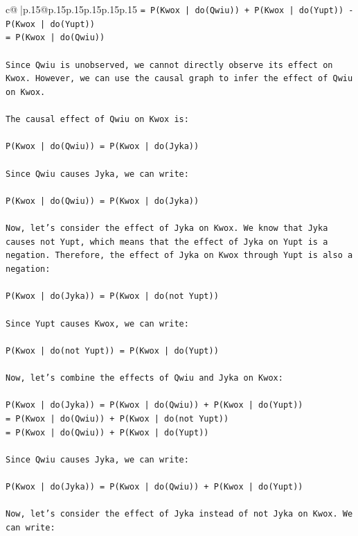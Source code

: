 \documentclass{article}
\begin{document}
{\begin{supertabular}{c@{$\;$}|p{.15\linewidth}@{}p{.15\linewidth}p{.15\linewidth}p{.15\linewidth}p{.15\linewidth}p{.15\linewidth}}
{{{\texttt{= P(Kwox | do(Qwiu)) + P(Kwox | do(Yupt)) {-} P(Kwox | do(Yupt))} \\
\texttt{= P(Kwox | do(Qwiu))} \\
\\ 
\texttt{Since Qwiu is unobserved, we cannot directly observe its effect on Kwox. However, we can use the causal graph to infer the effect of Qwiu on Kwox.} \\
\\ 
\texttt{The causal effect of Qwiu on Kwox is:} \\
\\ 
\texttt{P(Kwox | do(Qwiu)) = P(Kwox | do(Jyka))} \\
\\ 
\texttt{Since Qwiu causes Jyka, we can write:} \\
\\ 
\texttt{P(Kwox | do(Qwiu)) = P(Kwox | do(Jyka))} \\
\\ 
\texttt{Now, let's consider the effect of Jyka on Kwox. We know that Jyka causes not Yupt, which means that the effect of Jyka on Yupt is a negation. Therefore, the effect of Jyka on Kwox through Yupt is also a negation:} \\
\\ 
\texttt{P(Kwox | do(Jyka)) = P(Kwox | do(not Yupt))} \\
\\ 
\texttt{Since Yupt causes Kwox, we can write:} \\
\\ 
\texttt{P(Kwox | do(not Yupt)) = P(Kwox | do(Yupt))} \\
\\ 
\texttt{Now, let's combine the effects of Qwiu and Jyka on Kwox:} \\
\\ 
\texttt{P(Kwox | do(Jyka)) = P(Kwox | do(Qwiu)) + P(Kwox | do(Yupt))} \\
\texttt{= P(Kwox | do(Qwiu)) + P(Kwox | do(not Yupt))} \\
\texttt{= P(Kwox | do(Qwiu)) + P(Kwox | do(Yupt))} \\
\\ 
\texttt{Since Qwiu causes Jyka, we can write:} \\
\\ 
\texttt{P(Kwox | do(Jyka)) = P(Kwox | do(Qwiu)) + P(Kwox | do(Yupt))} \\
\\ 
\texttt{Now, let's consider the effect of Jyka instead of not Jyka on Kwox. We can write:} \\
}}}
\end{supertabular}}
\end{document}
